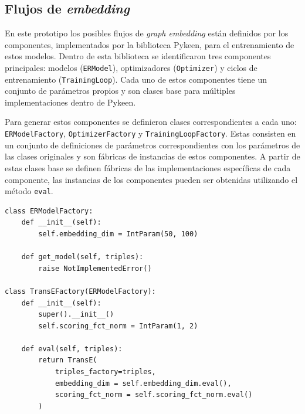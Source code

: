 











\subsection{Flujos de \textit{embedding}}

En este prototipo los posibles flujos de \textit{graph embedding} est\'an definidos por los
componentes, implementados por la biblioteca Pykeen, para el entrenamiento de  estos modelos. Dentro de esta biblioteca se identificaron tres
componentes principales: modelos (\texttt{ERModel}), optimizadores (\texttt{Optimizer}) y ciclos de entrenamiento (\texttt{TrainingLoop}).
Cada uno de estos componentes tiene un conjunto de par\'ametros propios y son clases base
para m\'ultiples implementaciones dentro de Pykeen.

Para generar estos componentes se definieron clases correspondientes a cada
uno: \texttt{ERModelFactory}, \texttt{OptimizerFactory} y \texttt{TrainingLoopFactory}.
Estas consisten en un conjunto de definiciones de par\'ametros correspondientes
con los par\'ametros de las clases originales y son f\'abricas de instancias de estos componentes.
A partir de estas clases base se definen f\'abricas
de las implementaciones espec\'ificas de cada componente, las instancias de
los componentes pueden ser obtenidas
utilizando el m\'etodo \texttt{eval}.

\begin{lstlisting}[caption= Clase f\'abrica del modelo TransE, label = code:model-factory]
class ERModelFactory:
    def __init__(self):
        self.embedding_dim = IntParam(50, 100)

    def get_model(self, triples):
        raise NotImplementedError()

class TransEFactory(ERModelFactory):
    def __init__(self):
        super().__init__()
        self.scoring_fct_norm = IntParam(1, 2)

    def eval(self, triples):
        return TransE(
            triples_factory=triples,
            embedding_dim = self.embedding_dim.eval(),
            scoring_fct_norm = self.scoring_fct_norm.eval()
        )


\end{lstlisting}


